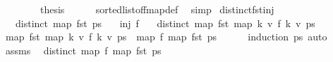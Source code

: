 \begin{isabellebody}
\ \ \isamarkupfalse%
\isanewline
\ \ \isamarkupfalse%
\ \isamarkupfalse%
\ {\isacharquery}{\kern0pt}thesis\isanewline
\ \ \ \ \isamarkupfalse%
\ sorted{\isacharunderscore}{\kern0pt}list{\isacharunderscore}{\kern0pt}of{\isacharunderscore}{\kern0pt}fmap{\isacharunderscore}{\kern0pt}def\ \isamarkupfalse%
\ simp\isanewline
{}\isamarkupfalse%
%
\endisatagproof
{\isafoldproof}%
%
\isadelimproof
\isanewline
%
\endisadelimproof
\isanewline
{}\isamarkupfalse%
\ distinct{\isacharunderscore}{\kern0pt}fst{\isacharunderscore}{\kern0pt}inj{\isacharcolon}{\kern0pt}\isanewline
\ \ \ {\isachardoublequoteopen}distinct\ {\isacharparenleft}{\kern0pt}map\ fst\ ps{\isacharparenright}{\kern0pt}{\isachardoublequoteclose}\isanewline
\ \ \ {\isachardoublequoteopen}inj\ f{\isachardoublequoteclose}\isanewline
\ \ \ {\isachardoublequoteopen}distinct\ {\isacharparenleft}{\kern0pt}map\ fst\ {\isacharparenleft}{\kern0pt}map\ {\isacharparenleft}{\kern0pt}{\isasymlambda}{\isacharparenleft}{\kern0pt}k{\isacharcomma}{\kern0pt}\ v{\isacharparenright}{\kern0pt}{\isachardot}{\kern0pt}\ {\isacharparenleft}{\kern0pt}f\ k{\isacharcomma}{\kern0pt}\ v{\isacharparenright}{\kern0pt}{\isacharparenright}{\kern0pt}\ ps{\isacharparenright}{\kern0pt}{\isacharparenright}{\kern0pt}{\isachardoublequoteclose}\isanewline
%
\isadelimproof
%
\endisadelimproof
%
\isatagproof
{}\isamarkupfalse%
\ {\isacharminus}{\kern0pt}\isanewline
\ \ \isamarkupfalse%
\ {\isachardoublequoteopen}map\ fst\ {\isacharparenleft}{\kern0pt}map\ {\isacharparenleft}{\kern0pt}{\isasymlambda}{\isacharparenleft}{\kern0pt}k{\isacharcomma}{\kern0pt}\ v{\isacharparenright}{\kern0pt}{\isachardot}{\kern0pt}\ {\isacharparenleft}{\kern0pt}f\ k{\isacharcomma}{\kern0pt}\ v{\isacharparenright}{\kern0pt}{\isacharparenright}{\kern0pt}\ ps{\isacharparenright}{\kern0pt}\ {\isacharequal}{\kern0pt}\ map\ f\ {\isacharparenleft}{\kern0pt}map\ fst\ ps{\isacharparenright}{\kern0pt}{\isachardoublequoteclose}\isanewline
\ \ \ \ \isamarkupfalse%
\ {\isacharparenleft}{\kern0pt}induction\ ps{\isacharparenright}{\kern0pt}\ auto\isanewline
\ \ \isamarkupfalse%
\ \isamarkupfalse%
\ assms\ \isamarkupfalse%
\ {\isachardoublequoteopen}distinct\ {\isacharparenleft}{\kern0pt}map\ f\ {\isacharparenleft}{\kern0pt}map\ fst\ ps{\isacharparenright}{\kern0pt}{\isacharparenright}{\kern0pt}{\isachardoublequoteclose}\isanewline

\end{isabellebody}

